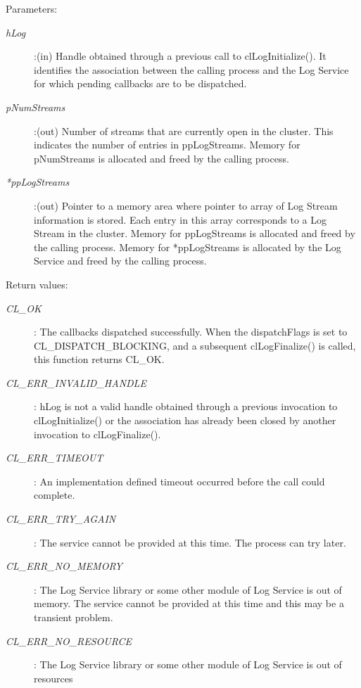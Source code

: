 \begin{flushleft}
\begin{Desc}
\begin{verbatim}
\end{verbatim}
\normalsize
\end{Desc}
\begin{Desc}
\item[Parameters:] \begin{description}
\item[{\em hLog}]:(in) Handle obtained through a previous call to clLogInitialize(). It identifies the association between the calling process and 
the Log Service for which pending callbacks are to be dispatched.
\item[{\em *pNumStreams}]:(out) Number of streams that are currently open in the cluster. This indicates the number of entries in ppLogStreams. Memory 
for pNumStreams is allocated and freed by the calling process.
\item[{\em **ppLogStreams}]:(out) Pointer to a memory area where pointer to array of Log Stream information is stored. Each entry in this array 
corresponds to a Log Stream in the cluster. Memory for ppLogStreams is allocated and freed by the calling process. Memory for *ppLogStreams 
is allocated by the Log Service and freed by the calling process.
\end{description}
\end{Desc}
\begin{Desc}
\item[Return values:]
\begin{description}
\item[{\em CL\_\-OK}]: The callbacks dispatched successfully. When the dispatchFlags is set to CL\_\-DISPATCH\_\-BLOCKING, and a subsequent
clLogFinalize() is called, this function returns CL\_\-OK.
\item[{\em CL\_\-ERR\_\-INVALID\_\-HANDLE}]: hLog is not a valid handle obtained through a previous invocation to 
clLogInitialize() or the association has already been closed by another invocation to clLogFinalize().
\item[{\em CL\_\-ERR\_\-TIMEOUT}]: An implementation defined timeout occurred before the call could complete.
\item[{\em CL\_\-ERR\_\-TRY\_\-AGAIN}]: The service cannot be provided at this time. The process can try later.
\item[{\em CL\_\-ERR\_\-NO\_\-MEMORY}]: The Log Service library or some other module of Log Service is out of memory. The service cannot 
be provided at this time and this may be a transient problem.
\item[{\em CL\_\-ERR\_\-NO\_\-RESOURCE}]: The Log Service library or some other module of Log Service is out of resources 

\end{description}
\end{Desc}
\end{flushleft}
